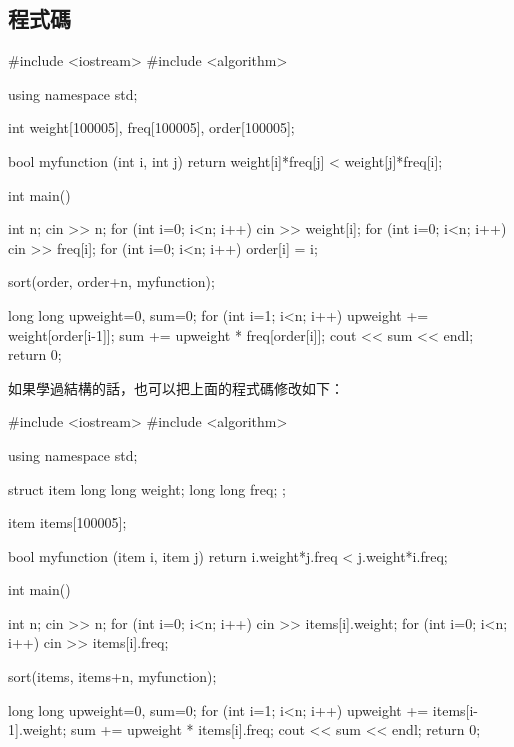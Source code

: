 \subsection{程式碼}
\begin{cppcode}
#include <iostream>
#include <algorithm>

using namespace std;

int weight[100005], freq[100005], order[100005];

bool myfunction (int i, int j) { return weight[i]*freq[j] < weight[j]*freq[i]; }

int main()
{
	int n;
	cin >> n;
	for (int i=0; i<n; i++) cin >> weight[i];
	for (int i=0; i<n; i++) cin >> freq[i];
	for (int i=0; i<n; i++) order[i] = i;
	
	sort(order, order+n, myfunction);
	
	long long upweight=0, sum=0;
	for (int i=1; i<n; i++) {
		upweight += weight[order[i-1]];
		sum += upweight * freq[order[i]];
	}
	cout << sum << endl;
	return 0;
}
\end{cppcode}

如果學過結構的話，也可以把上面的程式碼修改如下：

\begin{cppcode}
#include <iostream>
#include <algorithm>

using namespace std;

struct item {
	long long weight;
	long long freq;
};

item items[100005];

bool myfunction (item i, item j) { return i.weight*j.freq < j.weight*i.freq; }

int main()
{
	int n;
	cin >> n;
	for (int i=0; i<n; i++) cin >> items[i].weight;
	for (int i=0; i<n; i++) cin >> items[i].freq;
	
	sort(items, items+n, myfunction);
	
	long long upweight=0, sum=0;
	for (int i=1; i<n; i++) {
		upweight += items[i-1].weight;
		sum += upweight * items[i].freq;
	}
	cout << sum << endl;
	return 0;
}
\end{cppcode}
	